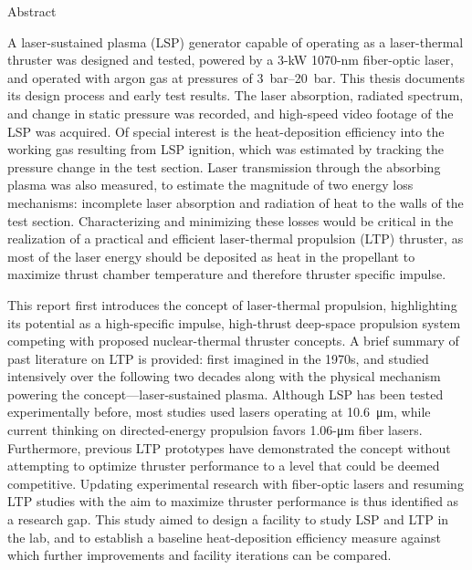 \begin{plainchp}{Abstract}

    A laser-sustained plasma (LSP) generator capable of operating as a laser-thermal thruster was designed and tested, powered by a \num{3}-\unit{kW} \num{1070}-\unit{nm} fiber-optic laser, and operated with argon gas at pressures of \qtyrange{3}{20}{bar}. This thesis documents its design process and early test results. The laser absorption, radiated spectrum, and change in static pressure was recorded, and high-speed video footage of the LSP was acquired. Of special interest is the heat-deposition efficiency into the working gas resulting from LSP ignition, which was estimated by tracking the pressure change in the test section. Laser transmission through the absorbing plasma was also measured, to estimate the magnitude of two energy loss mechanisms: incomplete laser absorption and radiation of heat to the walls of the test section. Characterizing and minimizing these losses would be critical in the realization of a practical and efficient laser-thermal propulsion (LTP) thruster, as most of the laser energy should be deposited as heat in the propellant to maximize thrust chamber temperature and therefore thruster specific impulse.

    This report first introduces the concept of laser-thermal propulsion, highlighting its potential as a high-specific impulse, high-thrust deep-space pro\-pulsion system competing with proposed nuclear-thermal thruster concepts. A brief summary of past literature on LTP is provided: first imagined in the 1970s, and studied intensively over the following two decades along with the physical mechanism powering the concept---laser-sustained plasma. Although LSP has been tested experimentally before, most studies used  lasers operating at \qty{10.6}{\um}, while current thinking on directed-energy pro\-pulsion favors \num{1.06}-\unit{\um} fiber lasers. Furthermore, previous LTP prototypes have demonstrated the concept without attempting to optimize thruster performance to a level that could be deemed competitive. Updating experimental research with fiber-optic lasers and resuming LTP studies with the aim to maximize thruster performance is thus identified as a research gap. This study aimed to design a facility to study LSP and LTP in the lab, and to establish a baseline heat-deposition efficiency measure against which further improvements and facility iterations can be compared.


\end{plainchp}
